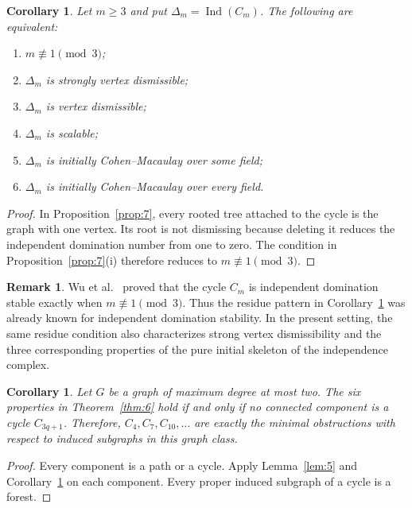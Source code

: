 \documentclass[11pt]{amsart}
\DeclareMathOperator{\Ind}{Ind}
\newtheorem{corollary}[theorem]{Corollary}
\theoremstyle{definition}
\newtheorem{remark}[theorem]{Remark}
\begin{document}
	\begin{corollary}\label{cor:8}
		Let $m\geq3$ and put $\Delta_m=\Ind(C_m)$.  The following are equivalent:
		\begin{enumerate}[label=\textup{(\roman*)}]
			\item $m\not\equiv1\pmod3$;
			\item $\Delta_m$ is strongly vertex dismissible;
			\item $\Delta_m$ is vertex dismissible;
			\item $\Delta_m$ is scalable;
			\item $\Delta_m$ is initially Cohen--Macaulay over some field;
			\item $\Delta_m$ is initially Cohen--Macaulay over every field.
		\end{enumerate}
	\end{corollary}
	
	\begin{proof}
		In Proposition~\ref{prop:7}, every rooted tree attached to the cycle is the graph with one vertex.  Its root is not dismissing because deleting it reduces the independent domination number from one to zero.  The condition in Proposition~\ref{prop:7}(i) therefore reduces to $m\not\equiv1\pmod3$.
	\end{proof}
	
	\begin{remark}
		Wu et al.\ \cite[Corollary~1]{WuEtAl2019} proved that the cycle $C_m$ is independent domination stable exactly when $m\not\equiv1\pmod3$. Thus the residue pattern in Corollary~\ref{cor:8} was already known for independent domination stability. In the present setting, the same residue condition also characterizes strong vertex dismissibility and the three corresponding properties of the pure initial skeleton of the independence complex.
	\end{remark}
	
	\begin{corollary}\label{cor:9}
		Let $G$ be a graph of maximum degree at most two.  The six properties in Theorem~\ref{thm:6} hold if and only if no connected component is a cycle $C_{3q+1}$.  Therefore, $C_4,C_7,C_{10},\ldots$ are exactly the minimal obstructions with respect to induced subgraphs in this graph class.
	\end{corollary}
	
	\begin{proof}
		Every component is a path or a cycle.  Apply Lemma~\ref{lem:5} and Corollary~\ref{cor:8} on each component.  Every proper induced subgraph of a cycle is a forest.
	\end{proof}
	
\end{document}
